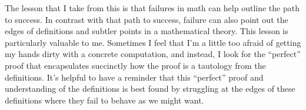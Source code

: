 \documentclass[12 pt, letterpaper]{hmcpset}
\begin{document}
\begin{solution}
	The lesson that I take from this is that failures in math can help outline the path to success. In contrast with that path to success, failure can also point out the edges of definitions and subtler points in a mathematical theory. This lesson is particularly valuable to me. Sometimes I feel that I'm a little too afraid of getting my hands dirty with a concrete computation, and instead, I look for the ``perfect'' proof that encapsulates succinctly how the proof is a tautology from the definitions. It's helpful to have a reminder that this ``perfect'' proof and understanding of the definitions is best found by struggling at the edges of these definitions where they fail to behave as we might want.
\end{solution}
 
\end{document}
